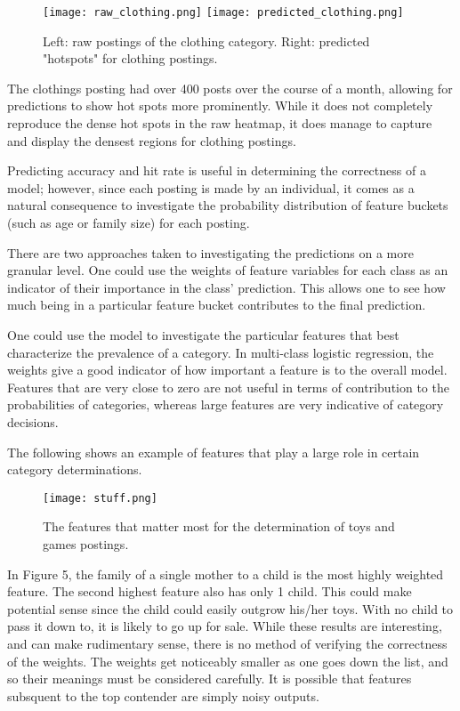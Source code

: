 \documentclass[12pt]{article}
\begin{document}
\begin{figure}[h]
\centering
\texttt{[image: raw\_clothing.png]}
\texttt{[image: predicted\_clothing.png]}
\caption{Left: raw postings of the clothing category. Right: predicted "hotspots" for clothing postings.}
\end{figure}

The clothings posting had over 400 posts over the course of a month, allowing for predictions to show hot spots more prominently. While it does not completely reproduce the dense hot spots in the raw heatmap, it does manage to capture and display the densest regions for clothing postings. 

Predicting accuracy and hit rate is useful in determining the correctness of a model; however, since each posting is made by an individual, it comes as a natural consequence to investigate the probability distribution of feature buckets (such as age or family size) for each posting. 

There are two approaches taken to investigating the predictions on a more granular level. One could use the weights of feature variables for each class as an indicator of their importance in the class' prediction. This allows one to see how much being in a particular feature bucket contributes to the final prediction. 

One could use the model to investigate the particular features that best characterize the prevalence of a category. In multi-class logistic regression, the weights give a good indicator of how important a feature is to the overall model. Features that are very close to zero are not useful in terms of contribution to the probabilities of categories, whereas large features are very indicative of category decisions. 

The following shows an example of features that play a large role in certain category determinations. 

\begin{figure}[h]
\centering
\texttt{[image: stuff.png]}
\caption{The features that matter most for the determination of toys and games postings.}
\end{figure}

In Figure 5, the family of a single mother to a child is the most highly weighted feature. The second highest feature also has only 1 child. This could make potential sense since the child could easily outgrow his/her toys. With no child to pass it down to, it is likely to go up for sale. 
While these results are interesting, and can make rudimentary sense, there is no method of verifying the correctness of the weights. The weights get noticeably smaller as one goes down the list, and so their meanings must be considered carefully. It is possible that features subsquent to the top contender are simply noisy outputs. 
\end{document}
